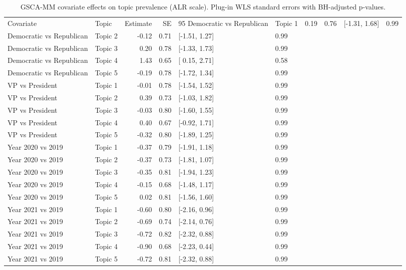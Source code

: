 \begin{table}[ht]
\centering
\begin{tabular}{llrrll}
  \toprule
Covariate & Topic & Estimate & SE & 95%
  \midrule
Democratic vs Republican & Topic 1 & 0.19 & 0.76 & [-1.31,  1.68] & 0.99 \\ 
  Democratic vs Republican & Topic 2 & -0.12 & 0.71 & [-1.51,  1.27] & 0.99 \\ 
  Democratic vs Republican & Topic 3 & 0.20 & 0.78 & [-1.33,  1.73] & 0.99 \\ 
  Democratic vs Republican & Topic 4 & 1.43 & 0.65 & [ 0.15,  2.71] & 0.58 \\ 
  Democratic vs Republican & Topic 5 & -0.19 & 0.78 & [-1.72,  1.34] & 0.99 \\ 
  VP vs President & Topic 1 & -0.01 & 0.78 & [-1.54,  1.52] & 0.99 \\ 
  VP vs President & Topic 2 & 0.39 & 0.73 & [-1.03,  1.82] & 0.99 \\ 
  VP vs President & Topic 3 & -0.03 & 0.80 & [-1.60,  1.55] & 0.99 \\ 
  VP vs President & Topic 4 & 0.40 & 0.67 & [-0.92,  1.71] & 0.99 \\ 
  VP vs President & Topic 5 & -0.32 & 0.80 & [-1.89,  1.25] & 0.99 \\ 
  Year 2020 vs 2019 & Topic 1 & -0.37 & 0.79 & [-1.91,  1.18] & 0.99 \\ 
  Year 2020 vs 2019 & Topic 2 & -0.37 & 0.73 & [-1.81,  1.07] & 0.99 \\ 
  Year 2020 vs 2019 & Topic 3 & -0.35 & 0.81 & [-1.94,  1.23] & 0.99 \\ 
  Year 2020 vs 2019 & Topic 4 & -0.15 & 0.68 & [-1.48,  1.17] & 0.99 \\ 
  Year 2020 vs 2019 & Topic 5 & 0.02 & 0.81 & [-1.56,  1.60] & 0.99 \\ 
  Year 2021 vs 2019 & Topic 1 & -0.60 & 0.80 & [-2.16,  0.96] & 0.99 \\ 
  Year 2021 vs 2019 & Topic 2 & -0.69 & 0.74 & [-2.14,  0.76] & 0.99 \\ 
  Year 2021 vs 2019 & Topic 3 & -0.72 & 0.82 & [-2.32,  0.88] & 0.99 \\ 
  Year 2021 vs 2019 & Topic 4 & -0.90 & 0.68 & [-2.23,  0.44] & 0.99 \\ 
  Year 2021 vs 2019 & Topic 5 & -0.72 & 0.81 & [-2.32,  0.88] & 0.99 \\ 
   \bottomrule
\end{tabular}
\caption{GSCA-MM covariate effects on topic prevalence (ALR scale). Plug-in WLS standard errors with BH-adjusted p-values.} 
\label{tab:gscamm-effects}
\end{table}
